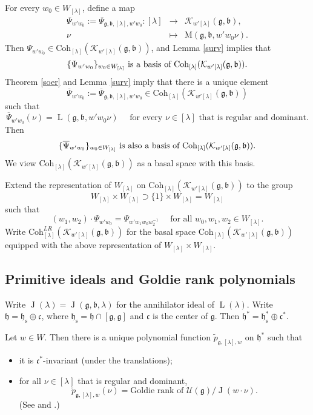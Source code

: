 \documentclass[12pt,a4paper]{amsart}
\newcommand{\CK}{{\mathcal {K}}}
\newcommand{\CU}{{\mathcal {U}}}
\newcommand{\oL}{\operatorname{L}}
\newcommand{\oJ}{\operatorname{J}}
\newcommand{\g}{\mathfrak g}
\newcommand{\h}{\mathfrak h}
\renewcommand{\b}{\mathfrak b}
\renewcommand{\c}{\mathfrak c}
\newcommand{\be}{\begin {equation}}
\newcommand{\ee}{\end {equation}}
\numberwithin{equation}{section}
\theoremstyle{remark}
\def\Coh{\mathrm{Coh}}
\newcommand{\Lam}{{[\lambda]}}
\begin{document}
For every $w_0\in W_\Lam$, define a map
\[
\begin{array}{rcl}
  \Psi_{w'w_0}:=  \Psi_{\g,\b,\Lam, w'w_0}: \Lam&\rightarrow  &\CK_{w' \Lam}(\g,\b), \\
   \nu&\mapsto& \mathrm M(\g,\b, w' w_0 \nu).
   \end{array}
\]
Then $ \Psi_{w'w_0}\in  \Coh_{\Lam}( \CK_{w'\Lam}(\g,\b))$, and Lemma  \ref{surv}  implies  that
\be\label{basisv}
\textrm{$\{ \Psi_{w'w_0}\}_{w_0\in W_\Lam}$ is a basis of $ \Coh_{\Lam}( \CK_{w'\Lam}(\g,\b))$.}
\ee
Theorem \ref{soer}  and Lemma  \ref{surv} imply that there is a unique element
\[
\overline \Psi_{w'w_0}:=\overline \Psi_{\g,\b, \Lam, w'w_0}\in  \Coh_{\Lam}( \CK_{ w'\Lam}(\g,\b))
\]
 such that
\[
\overline \Psi_{w'w_0}(\nu)=  \oL(\g,\b, w' w_0 \nu) \quad \textrm{ for  every $\nu\in \Lam$ that is regular and dominant.}
\]
Then
\begin{equation*}%
\textrm{$\{\overline \Psi_{w'w_0}\}_{w_0\in W_\Lam}$ is also a basis of $ \Coh_{\Lam}( \CK_{w'\Lam}(\g,\b))$.}
\end{equation*}
We view $ \Coh_{\Lam}( \CK_{w'\Lam}(\g,\b))$ as a basal space with this basis.

Extend the representation of $W_\Lam$ on  $\Coh_{\Lam}( \CK_{w'\Lam}(\g,\b))$ to the group
\[
W_\Lam\times W_\Lam\supset \{1\}\times W_\Lam=W_\Lam
\]
 such that
\[
  (w_1, w_2)\cdot \Psi_{w'w_0}= \Psi_{w' w_1 w_0 w_2^{-1}}\quad \textrm{ for all } w_0, w_1, w_2 \in W_\Lam.
\]
Write $\Coh^{LR}_{\Lam}( \CK_{w'\Lam}(\g,\b))$ for the basal space  $\Coh_{\Lam}( \CK_{w'\Lam}(\g,\b))$ equipped with the above representation of $W_\Lam\times W_\Lam$.



\subsection{Primitive ideals and Goldie rank polynomials}\label{secGoldie}
Write
 $\oJ(\lambda)=\oJ(\g,\b,\lambda)$ for the annihilator ideal of $\oL(\lambda)$.
Write $\h=\h_{\mathrm s}\oplus \c$, where $\h_{\mathrm s}=\h\cap [\g,\g]$ and $\c$ is the center of $\g$. Then $\h^*=\h_\mathrm s^*\oplus \c^*$.

Let $w\in W$. %
Then there is a unique
polynomial function $\tilde p_{\g,\Lam,w}$ on $\h^*$ such that
\begin{itemize}
\item it is $\c^*$-invariant (under the translations);
\item for all $\nu\in \Lam$ that is regular and dominant,
\[
 \tilde p_{\g,\Lam,w}(\nu)=\textrm{Goldie rank of } \CU(\g)/\oJ(w \cdot\nu).
\]
(See \cite[Section 5.12]{J1} and \cite[Section 2.10]{J.av}.)
\end{itemize}
\end{document}
